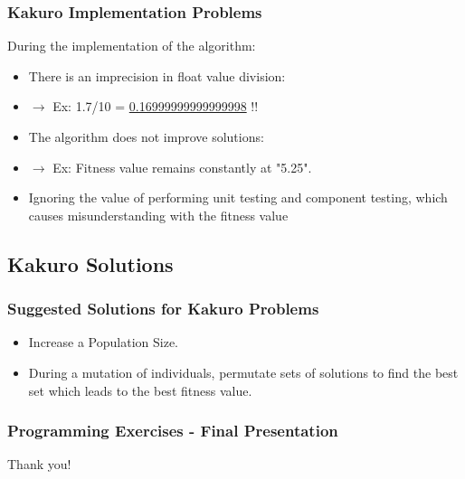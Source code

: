 \documentclass{beamer}
\begin{document}
			\begin{frame}
				\frametitle{Kakuro Implementation Problems}
				During the implementation of the algorithm:
				\begin{itemize}
					\item There is an imprecision in float value division:
					\item $\rightarrow$ Ex: 1.7/10 = \underline{0.16999999999999998} !!
					\item The algorithm does not improve solutions:
					\item $\rightarrow$ Ex: Fitness value remains constantly at "5.25".
					\item Ignoring the value of performing unit testing and component testing, which causes misunderstanding with the fitness value

				\end{itemize}
			\end{frame}

		\subsection{Kakuro Solutions}
			\begin{frame}
				\frametitle{Suggested Solutions for Kakuro Problems}
				\begin{itemize} [<+->]
					\item Increase a Population Size.
					\item During a mutation of individuals, permutate sets of solutions to find the best set which leads to  the best fitness value.
				\end{itemize}
			\end{frame}


	\begin{frame}
		\frametitle{Programming Exercises - Final Presentation}
		\begin{center}
			Thank you!
		\end{center}
	\end{frame}
\end{document}
